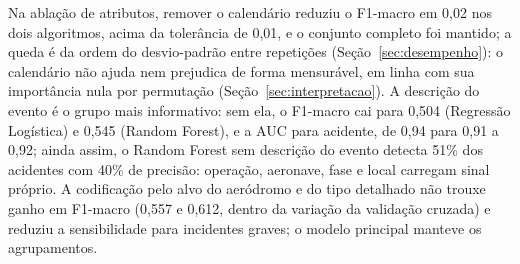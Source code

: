 \documentclass[12pt]{article}
\begin{document}
Na ablação de atributos, remover o calendário reduziu o F1-macro em 0,02 nos dois algoritmos, acima da tolerância de 0,01, e o conjunto completo foi mantido; a queda é da ordem do desvio-padrão entre repetições (Seção~\ref{sec:desempenho}): o calendário não ajuda nem prejudica de forma mensurável, em linha com sua importância nula por permutação (Seção~\ref{sec:interpretacao}). A descrição do evento é o grupo mais informativo: sem ela, o F1-macro cai para 0,504 (Regressão Logística) e 0,545 (Random Forest), e a AUC para acidente, de 0,94 para 0,91 a 0,92; ainda assim, o Random Forest sem descrição do evento detecta 51\% dos acidentes com 40\% de precisão: operação, aeronave, fase e local carregam sinal próprio. A codificação pelo alvo do aeródromo e do tipo detalhado não trouxe ganho em F1-macro (0,557 e 0,612, dentro da variação da validação cruzada) e reduziu a sensibilidade para incidentes graves; o modelo principal manteve os agrupamentos.
\end{document}
